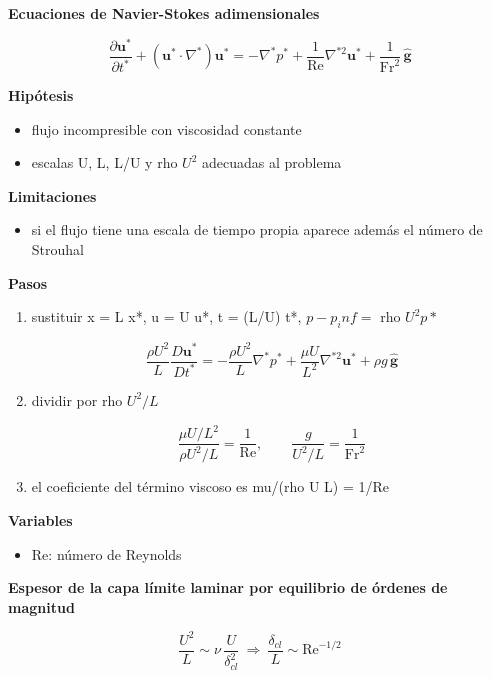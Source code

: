 \documentclass[10pt,openany]{book}
\begin{document}
\begin{tcolorbox}[title={Desarrollos del modelo}, studiumdef, breakable]

\noindent\textbf{Ecuaciones de Navier-Stokes adimensionales}

\[
\frac{\partial\mathbf{u}^{*}}{\partial t^{*}} + (\mathbf{u}^{*}\cdot\nabla^{*})\mathbf{u}^{*} = -\nabla^{*}p^{*} + \frac{1}{\mathrm{Re}}\nabla^{*2}\mathbf{u}^{*} + \frac{1}{\mathrm{Fr}^{2}}\,\hat{\mathbf{g}}
\]

\noindent\textbf{Hipótesis}
\begin{itemize}
\item flujo incompresible con viscosidad constante
\item escalas U, L, L/U y rho \(U^2\) adecuadas al problema
\end{itemize}

\noindent\textbf{Limitaciones}
\begin{itemize}
\item si el flujo tiene una escala de tiempo propia aparece además el número de Strouhal
\end{itemize}

\noindent\textbf{Pasos}
\begin{enumerate}
\item
sustituir x = L x*, u = U u*, t = (L/U) t*, \(p - p_inf =\) rho \(U^2 p*\)

\[
\frac{\rho U^{2}}{L}\frac{D\mathbf{u}^{*}}{Dt^{*}} = -\frac{\rho U^{2}}{L}\nabla^{*}p^{*} + \frac{\mu U}{L^{2}}\nabla^{*2}\mathbf{u}^{*} + \rho g\,\hat{\mathbf{g}}
\]
\item
dividir por rho \(U^2/L\)

\[
\frac{\mu U/L^{2}}{\rho U^{2}/L} = \frac{1}{\mathrm{Re}},\qquad \frac{g}{U^{2}/L} = \frac{1}{\mathrm{Fr}^{2}}
\]
\item
el coeficiente del término viscoso es mu/(rho U L) = 1/Re
\end{enumerate}

\noindent\textbf{Variables}
\begin{itemize}
\item $\mathrm{Re}$: número de Reynolds
\end{itemize}



\noindent\textbf{Espesor de la capa límite laminar por equilibrio de órdenes de magnitud}

\[
\frac{U^{2}}{L} \sim \nu\,\frac{U}{\delta_{cl}^{2}}\ \Rightarrow\ \frac{\delta_{cl}}{L} \sim \mathrm{Re}^{-1/2}
\]


\end{tcolorbox}
\end{document}
